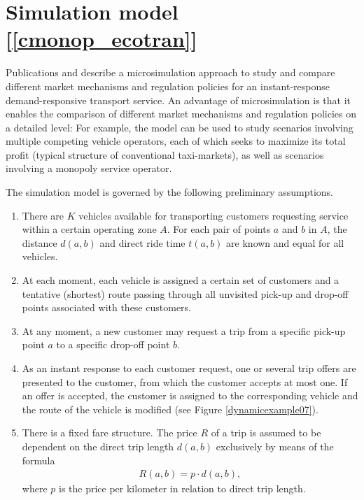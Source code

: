 \documentclass[dissertation,draft*]{aaltoseries}
\begin{document}
\section{Simulation model [\ref{cmonop_ecotran}]}
\label{simulationmodel}
Publications  and  describe a microsimulation approach to study and compare different market mechanisms and regulation policies for
an instant-response demand-responsive transport service.
An advantage of microsimulation is that 
it enables the comparison of different market mechanisms and regulation policies on a detailed level:
For example, the model can be used to study scenarios involving multiple competing vehicle operators,
each of which seeks to maximize its total profit (typical structure of conventional taxi-markets), as well as
scenarios involving a monopoly service operator.

The simulation model is governed by the following preliminary assumptions.
\begin{enumerate}
\item
There are $K$ vehicles available for transporting customers requesting service within a certain operating zone $A$. For each pair of points $a$ and $b$ in $A$, the distance $d(a,b)$ and direct ride time $t(a,b)$ are known and equal for all vehicles.
\item
At each moment, each vehicle is assigned a certain set of customers and a tentative (shortest) route passing through all 
unvisited pick-up and drop-off points associated with these customers. 
\item
At any moment, a new customer may request a trip from a specific pick-up point $a$ to a specific drop-off 
point $b$.
\item
As an instant response to each customer request, one or several trip offers are presented to the customer, from which the customer
accepts at most one. If an offer is accepted, the customer is assigned to the corresponding vehicle and the route of the vehicle
is modified (see Figure \ref{dynamicexample07}).
	\item
	There is a fixed fare structure. 
	The price $R$ of a trip is assumed to be dependent on the direct trip 
	length $d(a,b)$ exclusively by means of the formula
	\begin{align}
R(a,b)=p\cdot d(a,b),
\end{align}
where $p$ is the price per kilometer in relation to direct trip length.
\end{enumerate}
\end{document}
